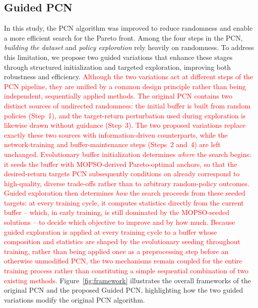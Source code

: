 \subsection{Guided PCN}\label{PCN_variation}
In this study, the PCN algorithm was improved to reduce randomness and enable a more efficient search for the Pareto front.
Among the four steps in the PCN, \textit{building the dataset} and \textit{policy exploration} rely heavily on randomness.
To address this limitation, we propose two guided variations that enhance these stages through structured initialization and targeted exploration, improving both robustness and efficiency.
\textcolor{red}{Although the two variations act at different steps of the PCN pipeline, they are unified by a common design principle rather than being independent, sequentially applied methods.
The original PCN contains two distinct sources of undirected randomness: the initial buffer is built from random policies (Step~1), and the target-return perturbation used during exploration is likewise drawn without guidance (Step~3).
The two proposed variations replace exactly these two sources with information-driven counterparts, while the network-training and buffer-maintenance steps (Steps~2 and~4) are left unchanged.
Evolutionary buffer initialization determines \emph{where} the search begins: it seeds the buffer with MOPSO-derived Pareto-optimal anchors, so that the desired-return targets PCN subsequently conditions on already correspond to high-quality, diverse trade-offs rather than to arbitrary random-policy outcomes.
Guided exploration then determines \emph{how} the search proceeds from these seeded targets: at every training cycle, it computes statistics directly from the current buffer -- which, in early training, is still dominated by the MOPSO-seeded solutions -- to decide which objective to improve and by how much.
Because guided exploration is applied at every training cycle to a buffer whose composition and statistics are shaped by the evolutionary seeding throughout training, rather than being applied once as a preprocessing step before an otherwise unmodified PCN, the two mechanisms remain coupled for the entire training process rather than constituting a simple sequential combination of two existing methods.}
Figure~\ref{fig:framework} illustrates the overall frameworks of the original PCN and the proposed Guided PCN, highlighting how the two guided variations modify the original PCN algorithm.
